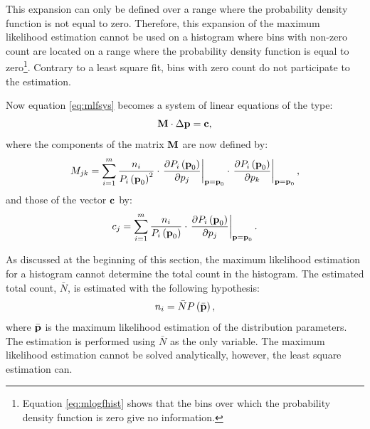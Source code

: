 This expansion can only be defined over a range where the
probability density function is not equal to zero. Therefore, this
expansion of the maximum likelihood estimation cannot be used on a
histogram where bins with non-zero count are located on a range
where the probability density function is equal to
zero\footnote{Equation \ref{eq:mlogfhist} shows that the bins over
which the probability density function is zero give no
information.}. Contrary to a least square fit, bins with zero
count do not participate to the estimation.

Now equation \ref{eq:mlfsys} becomes a system of linear equations
of the type:
\begin{equation}
\label{eq:mlflinequs}
  {\textbf M}\cdot\Delta{\textbf p}={\textbf c},
\end{equation}
where the components of the matrix ${\textbf M}$ are now defined by:
\begin{equation}
\label{eq:mlfmatrix}
 M_{jk}=\sum_{i=1}^m {\displaystyle
n_i\over\displaystyle P_i\left({\textbf p}_0\right)^2
}\cdot\left.{\displaystyle\partial P_i\left({\textbf p}_0\right)
\over\displaystyle\partial p_j} \right|_{{\textbf p}={\textbf
p}_0}\cdot\left.{\displaystyle\partial P_i\left({\textbf p}_0\right)
\over\displaystyle\partial p_k} \right|_{{\textbf p}={\textbf p}_0},
\end{equation}
and those of the vector ${\textbf c}$ by:
\begin{equation}
\label{eq:mlfvector}
 c_j=\sum_{i=1}^m {\displaystyle
n_i\over\displaystyle P_i\left({\textbf p}_0\right)
}\cdot\left.{\displaystyle\partial P_i\left({\textbf p}_0\right)
\over\displaystyle\partial p_j} \right|_{{\textbf p}={\textbf p}_0}.
\end{equation}

As discussed at the beginning of this section, the maximum
likelihood estimation for a histogram cannot determine the total
count in the histogram. The estimated total count, $\bar{N}$, is
estimated with the following hypothesis:
\begin{equation}
   n_i=\bar{N}P\left(\bar{\textbf p}\right),
\end{equation}
where $\bar{\textbf p}$ is the maximum likelihood estimation of the
distribution parameters. The estimation is performed using
$\bar{N}$ as the only variable. The maximum likelihood estimation
cannot be solved analytically, however, the least square
estimation can.


